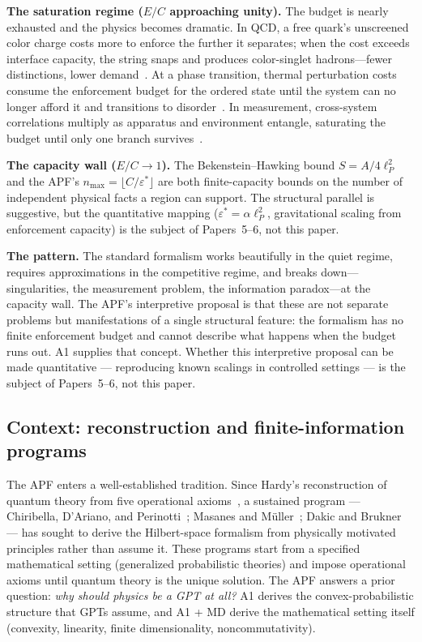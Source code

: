 \documentclass[11pt]{article}
\theoremstyle{remark}
\begin{document}
\medskip\noindent\textbf{The saturation regime ($E/C$ approaching unity).}
The budget is nearly exhausted and the physics becomes dramatic.  In QCD, a free quark's unscreened color charge costs more to enforce the further it separates; when the cost exceeds interface capacity, the string snaps and produces color-singlet hadrons---fewer distinctions, lower demand~\cite{Wilson1974}.  At a phase transition, thermal perturbation costs consume the enforcement budget for the ordered state until the system can no longer afford it and transitions to disorder~\cite{Wilson1983}.  In measurement, cross-system correlations multiply as apparatus and environment entangle, saturating the budget until only one branch survives~\cite{Zurek1981}.

\medskip\noindent\textbf{The capacity wall ($E/C \to 1$).}
The Bekenstein--Hawking bound $S = A/4\ell_P^2$~\cite{Bekenstein1981} and the APF's $n_{\max} = \lfloor C/\varepsilon^* \rfloor$ are both finite-capacity bounds on the number of independent physical facts a region can support.  The structural parallel is suggestive, but the quantitative mapping ($\varepsilon^* = \alpha\ell_P^2$, gravitational scaling from enforcement capacity) is the subject of Papers~5--6, not this paper.

\medskip\noindent\textbf{The pattern.}  The standard formalism works beautifully in the quiet regime, requires approximations in the competitive regime, and breaks down---singularities, the measurement problem, the information paradox---at the capacity wall.  The APF's interpretive proposal is that these are not separate problems but manifestations of a single structural feature: the formalism has no finite enforcement budget and cannot describe what happens when the budget runs out.  A1 supplies that concept.  Whether this interpretive proposal can be made quantitative --- reproducing known scalings in controlled settings --- is the subject of Papers~5--6, not this paper.


\subsection{Context: reconstruction and finite-information programs}
\label{sec:context}

The APF enters a well-established tradition.  Since Hardy's reconstruction of quantum theory from five operational axioms~\cite{Hardy2001}, a sustained program --- Chiribella, D'Ariano, and Perinotti~\cite{CDP2011}; Masanes and M\"uller~\cite{MM2011}; Dakic and Brukner~\cite{DakicBrukner2009} --- has sought to derive the Hilbert-space formalism from physically motivated principles rather than assume it.  These programs start from a specified mathematical setting (generalized probabilistic theories) and impose operational axioms until quantum theory is the unique solution.  The APF answers a prior question: \emph{why should physics be a GPT at all?}  A1 derives the convex-probabilistic structure that GPTs assume, and A1 + MD derive the mathematical setting itself (convexity, linearity, finite dimensionality, noncommutativity).
\end{document}
